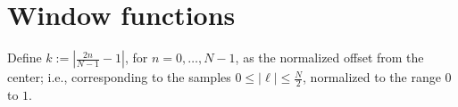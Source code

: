 \chapter{Window functions}\label{Sec:SparcoWindowFunc}




Define $k:= \left\vert \frac{2n}{N-1} - 1\right\vert$, for
$n=0,\ldots,N-1$, as the normalized offset from the center; i.e.,
corresponding to the samples $0 \leq \vert \ell\vert \leq
\frac{N}{2}$, normalized to the range $0$ to $1$.

